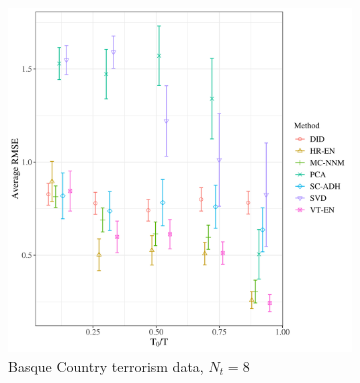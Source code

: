 \documentclass[12pt]{article}
\begin{document}
\maketitle \thispagestyle{empty}


{}%

\begin{figure}[htbp]
	\centering
	\begin{subfigure}[t]{0.48\textwidth}
		\centering
		\includegraphics[width=\textwidth]{plots/basque_N_16_T_43_numruns_20_num_treated_8_simultaneuous_1.png}
		\caption{Basque Country terrorism data, $N_t = 8$} 
	\end{subfigure}
	~ 
	\begin{subfigure}[t]{0.48\textwidth}
		\centering

\end{subfigure}
\end{figure}
\end{document}
